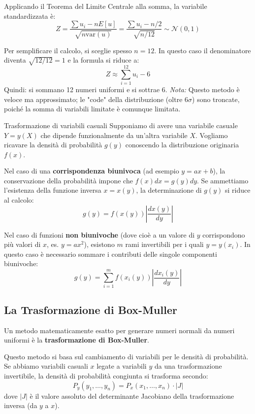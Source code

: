 \documentclass[openany,a4paper,12pt]{book}
\theoremstyle{remark}
\begin{document}
Applicando il Teorema del Limite Centrale alla somma, la variabile standardizzata è:
\begin{equation}
Z = \frac{\sum u_i - n E[u]}{\sqrt{n \text{var}(u)}} = \frac{\sum u_i - n/2}{\sqrt{n/12}} \sim \mathcal{N}(0,1)
\end{equation}

Per semplificare il calcolo, si sceglie spesso $n=12$. In questo caso il denominatore diventa $\sqrt{12/12} = 1$ e la formula si riduce a:
\begin{equation}
Z \approx \sum_{i=1}^{12} u_i - 6
\end{equation}
Quindi: si sommano 12 numeri uniformi e si sottrae 6.
\textit{Nota:} Questo metodo è veloce ma approssimato; le "code" della distribuzione (oltre $6\sigma$) sono troncate, poiché la somma di variabili limitate è comunque limitata.

\begin{bressan}{Trasformazione di variabili casuali}
Supponiamo di avere una variabile casuale $Y = y(X)$ che dipende funzionalmente da un'altra variabile $X$. Vogliamo ricavare la densità di probabilità $g(y)$ conoscendo la distribuzione originaria $f(x)$.

Nel caso di una \textbf{corrispondenza biunivoca} (ad esempio $y = ax + b$), la conservazione della probabilità impone che $f(x)dx = g(y)dy$. Se ammettiamo l'esistenza della funzione inversa $x = x(y)$, la determinazione di $g(y)$ si riduce al calcolo:
\begin{equation}
    g(y) = f(x(y))\left|\frac{dx(y)}{dy}\right|
\end{equation}

Nel caso di funzioni \textbf{non biunivoche} (dove cioè a un valore di $y$ corrispondono più valori di $x$, es. $y = ax^2$), esistono $m$ rami invertibili per i quali $y = y(x_i)$. In questo caso è necessario sommare i contributi delle singole componenti biunivoche:
\begin{equation}
    g(y) = \sum_{i=1}^{m} f(x_i(y))\left|\frac{dx_i(y)}{dy}\right|
\end{equation}
\end{bressan}
\subsection{La Trasformazione di Box-Muller}
Un metodo matematicamente esatto per generare numeri normali da numeri uniformi è la \textbf{trasformazione di Box-Muller}.

Questo metodo si basa sul cambiamento di variabili per le densità di probabilità. Se abbiamo variabili casuali $x$ legate a variabili $y$ da una trasformazione invertibile, la densità di probabilità congiunta si trasforma secondo:
\begin{equation}
P_y(y_1, \dots, y_n) = P_x(x_1, \dots, x_n) \cdot |J|
\end{equation}
dove $|J|$ è il valore assoluto del determinante Jacobiano della trasformazione inversa (da $y$ a $x$).
\end{document}
